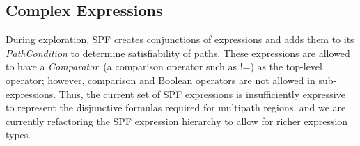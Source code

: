 \subsection{Complex Expressions}
During exploration, SPF creates conjunctions of expressions and adds them to its {\em PathCondition} to determine satisfiability of paths.
%
These expressions are allowed to have a \textit{Comparator}~(a comparison operator such as !=) as the top-level operator; however, comparison and Boolean operators are not allowed in sub-expressions.  Thus, the current set of SPF expressions is insufficiently expressive to represent the disjunctive formulas required for multipath regions, and we are currently refactoring the SPF expression hierarchy to allow for richer expression types.
%
%
%
